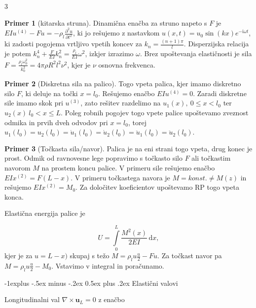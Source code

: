 \documentclass[10pt,landscape]{article}
\makeatletter
\renewcommand{\subsection}{\@startsection{subsection}{2}{0mm}%
	{-1explus -.5ex minus -.2ex}%
	{0.5ex plus .2ex}%
	{\normalfont\normalsize\bfseries}}
\theoremstyle{definition}
\newtheorem*{primer}{Primer}
\makeatother
\begin{document}
\begin{multicols}{3}
  \begin{primer}[kitarska struna]
    Dinamična enačba za struno napeto s \( F \) je \( EI u^{(4)} - F \ddot{u} = - \rho_l \frac{\partial ^2 u}{\partial t ^2}  \), ki jo rešujemo z nastavkom \( u(x, t) = u_0 \sin (kx) e^{-\mathrm{i} \omega t} \), ki zadosti pogojema vrtljivo vpetih koncev za \( k_n = \frac{(n + 1) \pi}{l} \). Disperzijska relacija je potem \( k_n ^4 + \frac{F}{EI} k_n ^2 = \frac{\rho_l}{EI} \omega ^2 \), izkjer izrazimo \( \omega \). Brez upoštevanja elastičnosti je sila \( F = \frac{\rho_l \omega_0 ^2}{k_0 ^2} = 4 \pi \rho R ^2 l ^2 \nu ^2 \), kjer je \( \nu \) osnovna frekvenca.
    \end{primer}

  \begin{primer}[Diskretna sila na palico]
    Togo vpeta palica, kjer imamo diskretno silo \( F \), ki deluje na točki \( x = l_0 \). Rešujemo enačbo \( EI u^{(4)} = 0 \). Zaradi diskretne sile imamo skok pri \( u^{(3)} \), zato rešitev razdelimo na \( u_1(x), \ 0 \leq x < l_0 \) ter \( u_2 (x) \ l_0 < x \leq L \). Poleg robnih pogojev togo vpete palice upoštevamo zveznost odmika in prvih dveh odvodov pri \( x = l_0 \), torej \( u_1 (l_0) = u_2 (l_0) = \dot{u}_1 (l_0) = \dot{u}_2 (l_0) = \ddot{u}_1 (l_0) = \ddot{u}_2 (l_0). \)
  \end{primer}

  \begin{primer}[Točkasta sila/navor]
    Palica je na eni strani togo vpeta, drug konec je prost. Odmik od ravnovesne lege popravimo s točkasto silo \( F \) ali točkastim navorom \( M \) na prostem koncu palice. V primeru sile rešujemo enačbo \( E I x^{(2)} = F (L - x) \). V primeru točkastega navora je \( M = konst. \ne M(z) \) in rešujemo \( EI x^{(2)} = M_0 \). Za določitev koeficientov upoštevamo RP togo vpeta konca.

    Elastična energija palice je

    \[ U = \int\limits_0^L \frac{M ^2 (x)}{2 E I} \, \mathrm{d} x, 
    \]
    kjer je za \( u = L - x) \) skupaj s težo \( M = \rho_l u \frac{u}{2} - F u \). Za točkast navor pa \( M = \rho_l u \frac{u}{2} - M_0 \). Vstavimo v integral in poračunamo.
  \end{primer}
  
  \subsection{Elastični valovi}

  Longitudinalni val \( \nabla \times \mathbf{u}_L = 0 \) z enačbo


\end{multicols}
\end{document}
